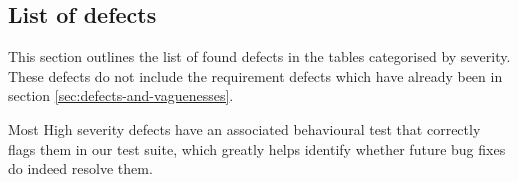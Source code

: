 \subsection{List of defects}

This section outlines the list of found defects in the tables categorised by severity. These defects do not include the requirement defects which have already been in section \ref{sec:defects-and-vaguenesses}. 
\par 

Most High severity defects have an associated behavioural test that correctly flags them in our test suite, which greatly helps identify whether future bug fixes do indeed resolve them.






